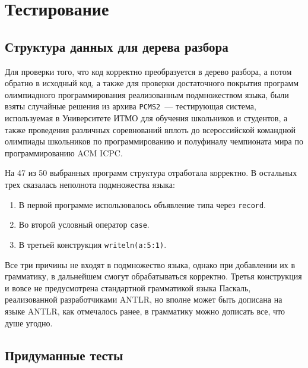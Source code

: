 \chapter{Тестирование}

\section{Структура данных для дерева разбора}
Для проверки того, что код корректно преобразуется в дерево разбора, а потом обратно в исходный код, а также
для проверки достаточного покрытия программ олимпиадного программирования реализованным подмножеством языка,
были взяты случайные решения из архива \texttt{PCMS2}~--- тестирующая система, используемая в Университете ИТМО
для обучения школьников и студентов, а также проведения различных соревнований вплоть до всероссийской командной
олимпиады школьников по программированию и полуфиналу чемпионата мира по программированию ACM ICPC.

На 47 из 50 выбранных программ структура отработала корректно. В остальных трех сказалась неполнота подмножества языка:
\begin{enumerate}
    \item В первой программе использовалось объявление типа через \texttt{record}.
    \item Во второй условный оператор \texttt{case}.
    \item В третьей конструкция \texttt{writeln(a:5:1)}.
\end{enumerate}
Все три причины не входят в подмножество языка, однако при добавлении их в грамматику, в дальнейшем смогут обрабатываться корректно.
Третья конструкция и вовсе не предусмотрена стандартной грамматикой языка Паскаль, реализованной разработчиками ANTLR, но вполне
может быть дописана на языке ANTLR, как отмечалось ранее, в грамматику можно дописать все, что душе угодно.

\section{Придуманные тесты}
